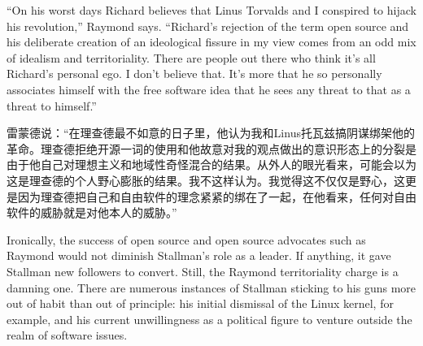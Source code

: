 \ifdefined\eng
``On his worst days Richard believes that Linus Torvalds and I conspired to hijack his revolution,'' Raymond says. ``Richard's rejection of the term open source and his deliberate creation of an ideological fissure in my view comes from an odd mix of idealism and territoriality. There are people out there who think it's all Richard's personal ego. I don't believe that. It's more that he so personally associates himself with the free software idea that he sees any threat to that as a threat to himself.''
\fi

\ifdefined\chs
雷蒙德说：“在理查德最不如意的日子里，他认为我和Linus托瓦兹搞阴谋绑架他的革命。理查德拒绝开源一词的使用和他故意对我的观点做出的意识形态上的分裂是由于他自己对理想主义和地域性奇怪混合的结果。从外人的眼光看来，可能会以为这是理查德的个人野心膨胀的结果。我不这样认为。我觉得这不仅仅是野心，这更是因为理查德把自己和自由软件的理念紧紧的绑在了一起，在他看来，任何对自由软件的威胁就是对他本人的威胁。”
\fi



\ifdefined\eng
Ironically, the success of open source and open source advocates such as Raymond would not diminish Stallman's role as a leader. If anything, it gave Stallman new followers to convert. Still, the Raymond territoriality charge is a damning one. There are numerous instances of Stallman sticking to his guns more out of habit than out of principle: his initial dismissal of the Linux kernel, for example, and his current unwillingness as a political figure to venture outside the realm of software issues.
\fi

